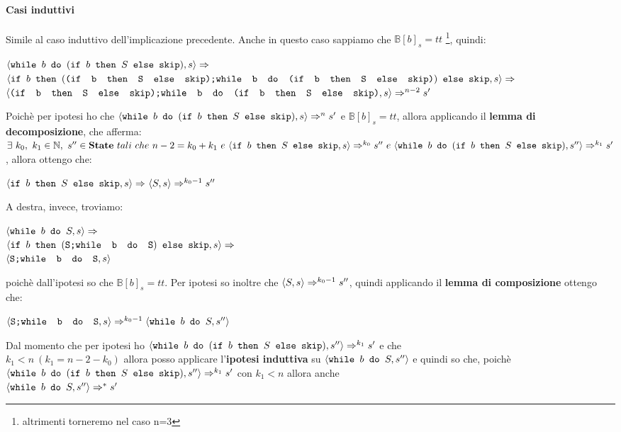 {   \paragraph{Casi induttivi}
	 Simile al caso induttivo dell'implicazione precedente.
	Anche in questo caso sappiamo che $\mathbb{B}[b]_s=tt$
	\footnote{altrimenti torneremo nel caso n=3}, quindi:
	\begin{center}
	$\confSs{\wbS{b}{(\ifABC{b}{S}{\skipistr})}}{s}\Rar{}$\\
	{\small
	$\confSs{
		\ifABC{b}
			{(\concat{(\ifABC{b}{S}{\skipistr})}
			{\wbS{b}{(\ifABC{b}{S}{\skipistr})}})}
			{\skipistr}
	}{s}\Rar{}$}\\
	$\confSs{\concat{(\ifABC{b}{S}{\skipistr})}{\wbS{b}
	{(\ifABC{b}{S}{\skipistr})}}}{s}\Rar{n-2}s'$
	\end{center}
	Poichè per ipotesi ho che 
	$\confSs{\wbS{b}{(\ifABC{b}{S}{\skipistr})}}{s}\Rar{n}s'$ e 
	$\mathbb{B}[b]_s=tt$, allora applicando il \textbf{lemma di decomposizione},
	che afferma: $\exists{}~k_0,~k_1\in\mathbb{N},~s''\in\states~tali~che~n-2=
	k_0+k_1~e~\confSs{\ifABC{b}{S}{\skipistr}}{s}\Rar{k_0}s''~e~\confSs{\wbS{b}
	{(\ifABC{b}{S}{\skipistr})}}{s''}\Rar{k_1}s'$, allora ottengo che:
	\begin{center}
	$\confSs{\ifABC{b}{S}{\skipistr}}{s}\Rar{}\confSs{S}{s}\Rar{k_0-1}s''$
	\end{center}
	A destra, invece, troviamo:
	\begin{center}
	$\confSs{\wbS{b}{S}}{s}\Rar{}$\\
	$\confSs{
		\ifABC{b}
		{(\concat{S}
		{\wbS{b}{S}})}
		{\skipistr}}{s}\Rar{}$\\
	$\confSs{{\concat{S}{\wbS{b}{S}}}}{s}$
	\end{center}
	poichè dall'ipotesi so che $\mathbb{B}[b]_s=tt$. Per ipotesi so inoltre che
	$\confSs{S}{s}\Rar{k_0-1}s''$, quindi applicando il \textbf{lemma di
	composizione} ottengo che:
	\begin{center}
	$\confSs{{\concat{S}{\wbS{b}{S}}}}{s}\Rar{k_0-1}\confSs{\wbS{b}{S}}{s''}$
	\end{center}
	Dal momento che per ipotesi ho $\confSs{\wbS{b}{(\ifABC{b}{S}
	{\skipistr})}}{s''}\Rar{k_1}s'$ e che \\$k_1<n~(k_1=n-2-k_0)$ allora posso
	applicare l'\textbf{ipotesi induttiva} su $\confSs{\wbS{b}{S}}{s''}$ e
	quindi so che, poichè $\confSs{\wbS{b}{(\ifABC{b}{S}{\skipistr})}}
	{s''}\Rar{k_1}s'$ con $k_1<n$ allora anche \\
	$\confSs{\wbS{b}{S}}{s''}\Rar{*}s'$
}
\newpage